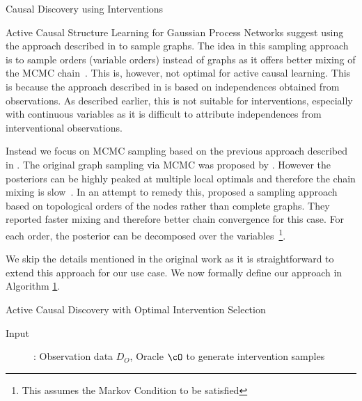 \documentclass[10pt]{article}
\begin{document}
\begin{psection}[4]{Causal Discovery using Interventions}
\begin{psubsection}{Active Causal Structure Learning for Gaussian Process Networks}
        \citet{kgelgen2019optimal} suggest using the approach described in
        \citep{agrawal2018minimal} to sample graphs. The idea in this sampling approach
        is to sample orders (variable orders) instead of graphs as it offers better
        mixing of the MCMC chain~\cite{friedman2001}. This is, however, not optimal for
        active causal learning. This is because the approach described in
        \citep{agrawal2018minimal} is based on independences obtained from observations.
        As described earlier, this is not suitable for interventions, especially with
        continuous variables as it is difficult to attribute independences from
        interventional observations.

        Instead we focus on MCMC sampling based on the previous approach described in
        \citep{friedman2001}. The original graph sampling via MCMC was proposed by
        \citet{madigan1995}. However the posteriors can be highly peaked at multiple
        local optimals and therefore the chain mixing is slow~\cite{friedman2001}. In
        an attempt to remedy this, \citet{friedman2001} proposed a sampling approach
        based on topological orders of the nodes rather than complete graphs. They
        reported faster mixing and therefore better chain convergence for this case.
        For each order, the posterior can be decomposed over the
        variables~\footnote{This assumes the Markov Condition to be satisfied}.

        We skip the details mentioned in the original work as it is straightforward
        to extend this approach for our use case. We now formally define our approach in
        Algorithm \hyperlink{algo:1}{1}.

        \begin{algo}[0.9\textwidth]{Active Causal Discovery with Optimal Intervention Selection}
        
            \begin{description}
                \item[Input]: Observation data $D_O$, Oracle $\cO$ to generate
                    intervention samples


\end{description}
\end{algo}
\end{psubsection}
\end{psection}
\end{document}
